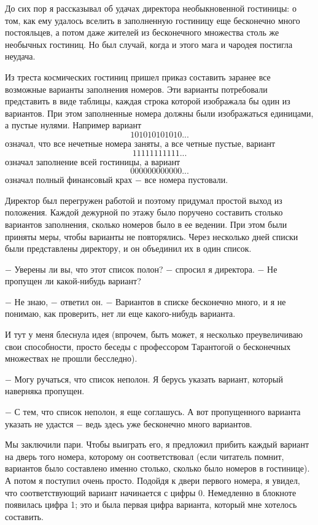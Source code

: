 \documentclass{article}
\begin{document}
До сих пор я рассказывал об удачах директора необыкновенной гостиницы: о том, как ему удалось вселить в заполненную гостиницу еще бесконечно много постояльцев, а потом даже жителей из бесконечного множества столь же необычных гостиниц. Но был случай, когда и этого мага и чародея постигла неудача.

Из треста космических гостиниц пришел приказ составить заранее все возможные варианты заполнения номеров. Эти варианты потребовали представить в виде таблицы, каждая строка которой изображала бы один из вариантов. При этом заполненные номера должны были изображаться единицами, а пустые нулями. Например вариант
\[
101010101010...
\]
означал, что все нечетные номера заняты, а все четные пустые, вариант
\[
11111111111...
\]
означал заполнение всей гостиницы, а вариант
\[
000000000000...
\]
означал полный финансовый крах \(-\) все номера пустовали.

Директор был перегружен работой и поэтому придумал простой выход из положения. Каждой дежурной по этажу было поручено составить столько вариантов заполнения, сколько номеров было в ее ведении. При этом были приняты меры, чтобы варианты не повторялись. Через несколько дней списки были представлены директору, и он объединил их в один список.

\(-\) Уверены ли вы, что этот список полон? \(-\) спросил я директора. \(-\) Не пропущен ли какой-нибудь вариант?

\(-\) Не знаю, \(-\) ответил он. \(-\) Вариантов в списке бесконечно много, и я не понимаю, как проверить, нет ли еще какого-нибудь варианта.

И тут у меня блеснула идея (впрочем, быть может, я несколько преувеличиваю свои способности, просто беседы с профессором Тарантогой о бесконечных множествах не прошли бесследно).

\(-\) Могу ручаться, что список неполон. Я берусь указать вариант, который наверняка пропущен.

\(-\) С тем, что список неполон, я еще соглашусь. А вот пропущенного варианта указать не удастся \(-\) ведь здесь уже бесконечно много вариантов.

Мы заключили пари. Чтобы выиграть его, я предложил прибить каждый вариант на дверь того номера, которому он соответствовал (если читатель помнит, вариантов было составлено именно столько, сколько было номеров в гостинице). А потом я поступил очень просто. Подойдя к двери первого номера, я увидел, что соответствующий вариант начинается с цифры 0. Немедленно в блокноте появилась цифра 1; это и была первая цифра варианта, который мне хотелось составить.
\end{document}
